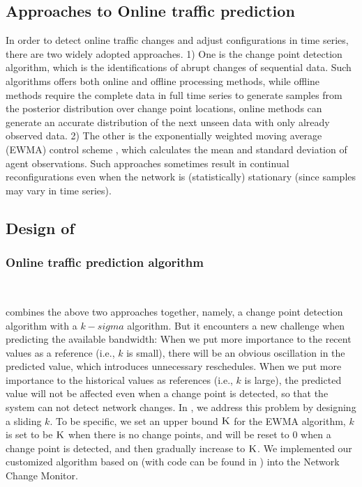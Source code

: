 {\subsection{Approaches to Online traffic prediction}
\label{subsec:dynamic:prediction}
In order to detect online traffic changes and adjust configurations in time series, there are two widely adopted approaches. 1) One is the change point detection algorithm, which is the identifications of abrupt changes of sequential data. Such algorithms offers both online and offline processing methods, while offline methods \cite{smith1975bayesian,stephens1994bayesian,barry1993bayesian,green1995reversible} require the complete data in full time series to generate samples from the posterior distribution over change point locations, online methods \cite{page1955test,desobry2005online,lorden1971procedures} can generate an accurate distribution of the next unseen data with only already observed data. 2) The other is the exponentially weighted moving average (EWMA) control scheme \cite{roberts1959control,lucas1990exponentially}, which calculates the mean and standard deviation of agent observations. Such approaches sometimes result in continual reconfigurations even when the network is (statistically) stationary (since samples may vary in time series).

\subsection{Design of \newname}
\subsubsection{Online traffic prediction algorithm}
\

\newname combines the above two approaches together, namely, a change point detection algorithm \cite{adams2007bayesian} with a $k-sigma$ algorithm. But it encounters a new challenge when predicting the available bandwidth: When we put more importance to the recent values as a reference (i.e., $k$ is small), there will be an obvious oscillation in the predicted value, which introduces unnecessary reschedules. When we put more importance to the historical values as references (i.e., $k$ is large), the predicted value will not be affected even when a change point is detected, so that the system can not detect network changes. In \newname, we address this problem by designing a sliding $k$. To be specific, we set an upper bound $\textsc{K}$ for the EWMA algorithm, $k$ is set to be $\textsc{K}$ when there is no change points, and will be reset to $0$ when a change point is detected, and then gradually increase to $\textsc{K}$. We implemented our customized algorithm based on \cite{adams2007bayesian} (with code can be found in \cite{BOCDcode}) into the Network Change Monitor.

}
